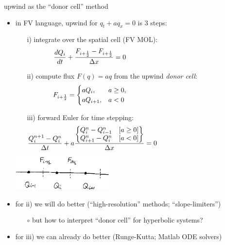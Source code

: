\documentclass[10pt,dvipsnames,usepdftitle=false,
hyperref={pdftitle = {Finite volume methods},
    pdfauthor = {Ed Bueler}}]{beamer}
\newcommand{\Fiphalf}{{F_{i+\frac{1}{2}}}}
\begin{document}
\begin{frame}{upwind as the ``donor cell'' method}

\begin{itemize}
\item in FV language, upwind for $q_t + a q_x = 0$ is 3 steps:
    \begin{itemize}
    \item[i)] integrate over the spatial cell (FV MOL):
        $$\frac{dQ_i}{dt} + \frac{\Fiphalf-\Fiphalf}{\Delta x} = 0 \hspace{50mm}$$
    \item[ii)] compute flux $F(q)=aq$ from the upwind \emph{donor cell}:
        $$\Fiphalf = \begin{cases} a Q_{i}, & a \ge 0, \\
                                   a Q_{i+1}, & a < 0 \end{cases} \hspace{50mm}$$
    \item[iii)] forward Euler for time stepping:
        $$\frac{Q_i^{n+1} - Q_i^n}{\Delta t} + a \frac{\begin{Bmatrix} Q^n_{i}-Q^n_{i-1} \quad [a\ge 0] \\ Q^n_{i+1}-Q^n_{i} \quad [a<0] \end{Bmatrix}}{\Delta x} = 0 \hspace{50mm}$$
    \end{itemize}

\vspace{-30mm}

\hfill \includegraphics[width=0.4\textwidth]{figs/cellfluxsketch}

\vspace{12mm}
\item for ii) we will do better (``high-resolution'' methods; ``slope-limiters'')
    \begin{itemize}
    \item[$\circ$] but how to interpret ``donor cell'' for hyperbolic systems?
    \end{itemize}
\item for iii) we can already do better (Runge-Kutta; Matlab ODE solvers)
\end{itemize}
\end{frame}
\end{document}
